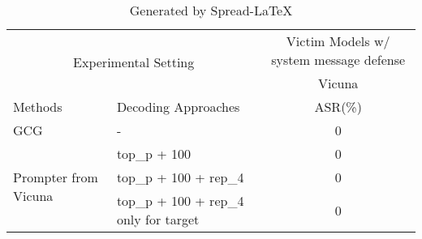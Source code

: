 \begin{table}[!htp]\centering
\caption{Generated by Spread-LaTeX}\label{tab: }
\scriptsize
\begin{tabular}{llc}\toprule
\multicolumn{2}{c}{\multirow{2}{*}{Experimental Setting}} &\multicolumn{1}{c}{Victim Models w/ system message defense} \\
\cmidrule{3-3}
& &Vicuna \\
\midrule
Methods & Decoding Approaches &ASR(\%)\\
\midrule
GCG & - & 0 \\
\cmidrule{1-3}
\multirow{3}{*}{Prompter from Vicuna} & top\_p + 100 & 0 \\
&top\_p + 100 + rep\_4 &0 \\
&top\_p + 100 + rep\_4 only for target &0 \\
\bottomrule
\end{tabular}
\end{table}

